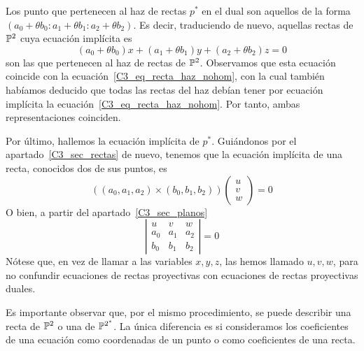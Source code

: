 Los punto que pertenecen al haz de rectas $p^*$ en el dual son aquellos de la forma\\
$(a_0+\theta b_0:a_1+\theta b_1:a_2+\theta b_2)$. Es decir, traduciendo de nuevo, aquellas rectas de $\mathbb{P}^2$ cuya ecuación implícita es
\begin{equation*}
	(a_0+\theta b_0)x+(a_1+\theta b_1)y+(a_2+\theta b_2)z=0
\end{equation*}
son las que pertenecen al haz de rectas de $\mathbb{P}^2$. Observamos que esta ecuación coincide con la ecuación~\eqref{C3_eq_recta_haz_nohom}, con la cual también habíamos deducido que todas las rectas del haz debían tener por ecuación implícita la ecuación~\eqref{C3_eq_recta_haz_nohom}. Por tanto, ambas representaciones coinciden.

Por último, hallemos la ecuación implícita de $p^*$. Guiándonos por el apartado~\ref{C3_sec_rectas} de nuevo, tenemos que la ecuación implícita de una recta, conocidos dos de sus puntos, es 
\begin{equation}
((a_0,a_1,a_2)\times(b_0,b_1,b_2))\left( \begin{array}{c}
u\\
v\\
w
\end{array}\right) =0
\end{equation}
O bien, a partir del apartado~\ref{C3_sec_planos}
\begin{equation}
	\label{C3_eq_implicita_rectadual_determinante}
	\left| \begin{array}{ccc}
	u & v & w \\
	a_0 & a_1 & a_2\\
	b_0 & b_1 & b_2
	\end{array}\right| =0
\end{equation}
Nótese que, en vez de llamar a las variables $x,y, z$, las hemos llamado $u,v,w$, para no confundir ecuaciones de rectas proyectivas con ecuaciones de rectas proyectivas duales.

\begin{obs}
	Es importante observar que, por el mismo procedimiento, se puede describir una recta de $\mathbb{P}^2$ o una de $\mathbb{P}^{2^*}$. La única diferencia es si consideramos los coeficientes de una ecuación como coordenadas de un punto o como coeficientes de una recta.
\end{obs}

